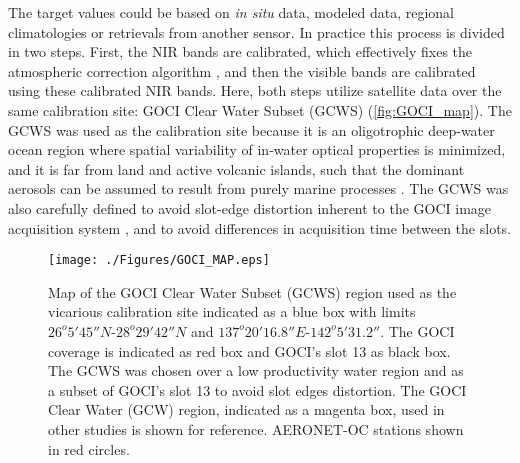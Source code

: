 \documentclass[10pt]{article}
\begin{document}
The target values could be based on {\it in situ } data, modeled data, regional climatologies or retrievals from another sensor. In practice this process is divided in two steps. First, the NIR bands are calibrated, which effectively fixes the atmospheric correction algorithm \cite{Franz:07}, and then the visible bands are calibrated using these calibrated NIR bands.  Here, both steps utilize satellite data over the same calibration site: GOCI Clear Water Subset (GCWS) (\autoref{fig:GOCI_map}). The GCWS was used as the calibration site because it is an oligotrophic deep-water ocean region where spatial variability of in-water optical properties is minimized, and it is far from land and active volcanic islands, such that the dominant aerosols can be assumed to result from purely marine processes \cite{Franz:07}. The GCWS was also carefully defined to avoid slot-edge distortion inherent to the GOCI image acquisition system \cite{Kim:2015,Kim:2016}, and to avoid differences in acquisition time between the slots. 
\begin{figure}[H]
  \centering
  \texttt{[image: ./Figures/GOCI\_MAP.eps]}
    \caption{Map of the GOCI Clear Water Subset (GCWS) region used as the vicarious calibration site indicated as a blue box with limits $26^o 5' 45''N$-$28^o 29' 42''N$ and $137^o 20' 16.8''E$-$142^o 5' 31.2''$. The GOCI coverage is indicated as red box and GOCI's slot 13 as black box. The GCWS was chosen over a low productivity water region and as a subset of GOCI's slot 13 to avoid slot edges distortion. The GOCI Clear Water (GCW) region, indicated as a magenta box, used in other studies is shown for reference. AERONET-OC stations shown in red circles. \label{fig:GOCI_map}} 
\end{figure}


\end{document}
